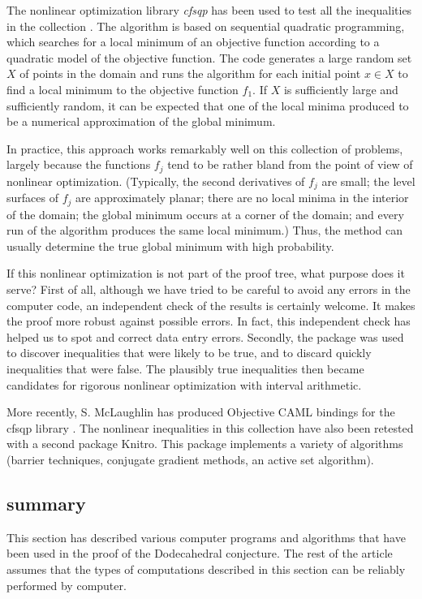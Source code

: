 The nonlinear optimization library {\it cfsqp} has been used to
test all the inequalities in the collection \cite{cfsqp}.  
The algorithm
is based on sequential quadratic programming, which
searches for a local minimum of an objective function
according to a quadratic model of the objective
function.  The code generates a large random set $X$ of points in the
domain and runs the algorithm for each initial point $x\in X$ to
find a local minimum to the objective function $f_1$.  If $X$
is sufficiently large and sufficiently random, it can
be expected that one
of the local minima produced to be a numerical approximation
of the  global minimum.

In practice, this approach works remarkably well on this
collection of problems, largely because the functions $f_j$
tend to be rather bland from the point of view of nonlinear
optimization.  (Typically, the second derivatives of $f_j$
are small; the level surfaces of $f_j$ are approximately planar;
there are no local minima in the interior of the domain;
the global minimum occurs at a corner of the domain; and
every run of the algorithm produces the same local minimum.)
Thus, the method can usually determine the true global minimum with
high probability.


If this nonlinear optimization is not part of the proof tree,
what purpose does it serve? First of all, although we have
tried to be careful to avoid any errors in the computer code,
an independent check of the results is certainly welcome.
It makes the proof more robust against possible errors.  
In fact,
this independent check has helped us to spot and correct 
 data entry errors.  Secondly, the package was used to discover
inequalities that were likely to be true, and to discard quickly
inequalities that were false.  The plausibly true inequalities
then became candidates for  rigorous nonlinear optimization
with interval arithmetic.

More recently, 
S. McLaughlin has produced Objective CAML bindings for the
cfsqp library \cite{McLp}.  The nonlinear inequalities in this
collection have also been retested with a second package
Knitro.  This package implements a variety of algorithms
(barrier techniques, conjugate gradient methods, an active set algorithm).


\subsection{summary}

This section has described various computer programs 
and algorithms that
have been used in the proof of the Dodecahedral conjecture.
The rest of the article assumes that the types of
computations described in this section can be reliably performed
by computer.


